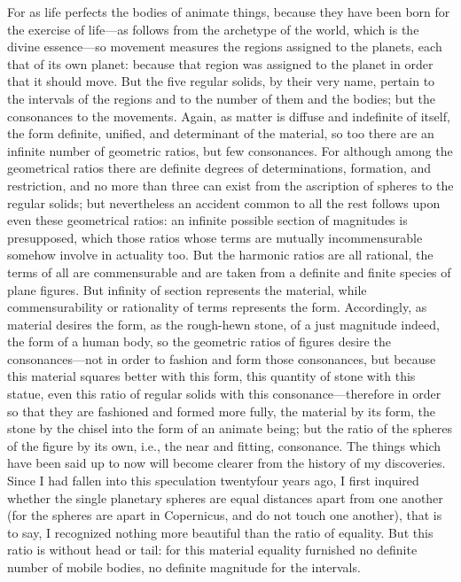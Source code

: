 \documentclass{article}
\begin{document}
For as life perfects the bodies of animate things, because they have been
born for the exercise of life—as follows from the archetype of the world,
which is the divine essence—so movement measures the regions
assigned to the planets, each that of its own planet: because that region
was assigned to the planet in order that it should move. But the five
regular solids, by their very name, pertain to the intervals of the regions
and to the number of them and the bodies; but the consonances to the
movements. Again, as matter is diffuse and indefinite of itself, the form
definite, unified, and determinant of the material, so too there are an
infinite number of geometric ratios, but few consonances. For although
among the geometrical ratios there are definite degrees of
determinations, formation, and restriction, and no more than three can
exist from the ascription of spheres to the regular solids; but
nevertheless an accident common to all the rest follows upon even these
geometrical ratios: an infinite possible section of magnitudes is
presupposed, which those ratios whose terms are mutually
incommensurable somehow involve in actuality too. But the harmonic
ratios are all rational, the terms of all are commensurable and are taken
from a definite and finite species of plane figures. But infinity of section
represents the material, while commensurability or rationality of terms
represents the form. Accordingly, as material desires the form, as the
rough-hewn stone, of a just magnitude indeed, the form of a human
body, so the geometric ratios of figures desire the consonances—not in
order to fashion and form those consonances, but because this material
squares better with this form, this quantity of stone with this statue, even
this ratio of regular solids with this consonance—therefore in order so
that they are fashioned and formed more fully, the material by its form,
the stone by the chisel into the form of an animate being; but the ratio of
the spheres of the figure by its own, i.e., the near and fitting, consonance.
The things which have been said up to now will become clearer from the
history of my discoveries. Since I had fallen into this speculation twentyfour years ago, I first inquired whether the single planetary spheres are
equal distances apart from one another (for the spheres are apart in
Copernicus, and do not touch one another), that is to say, I recognized
nothing more beautiful than the ratio of equality. But this ratio is
without head or tail: for this material equality furnished no definite
number of mobile bodies, no definite magnitude for the intervals.
\end{document}
